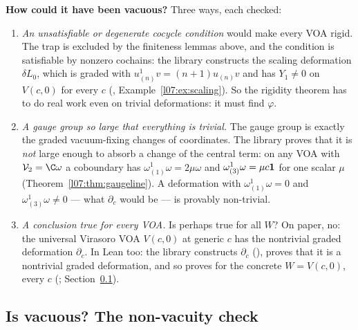 \begin{dictionary}
\textbf{How could it have been vacuous?} Three ways, each checked:
\begin{enumerate}
\item \emph{An unsatisfiable or degenerate cocycle condition} would make every VOA rigid. The
   trap is excluded by the finiteness lemmas above, and the condition is satisfiable
  by nonzero cochains: the library constructs the scaling deformation $\delta L_0$, which is graded
  with $u^1_{(n)}v = (n+1)u_{(n)}v$ and has $Y_1\neq0$ on $V(c,0)$ for every $c$
  (, Example~\ref{l07:ex:scaling}).
  So the rigidity theorem has to do real work even on trivial deformations: it must find $\varphi$.
\item \emph{A gauge group so large that everything is trivial.} The gauge group is exactly the
  graded vacuum-fixing changes of coordinates. The library proves that it is \emph{not} large
  enough to absorb a change of the central term: on any VOA with $\lsevenV_2 = \C\omega$ a coboundary
  has $\omega^1_{(1)}\omega = 2\mu\omega$ and $\omega^1_{(3)}\omega = \mu c\mathbf{1}$ for one scalar $\mu$
  (Theorem~\ref{l07:thm:gaugeline}). A deformation with $\omega^1_{(1)}\omega = 0$ and
  $\omega^1_{(3)}\omega\ne0$ --- what $\partial_c$ would be --- is provably non-trivial.
\item \emph{A conclusion true for every VOA.} Is  perhaps true for all $W$?
  On paper, no: the universal Virasoro VOA $V(c,0)$ at generic $c$ has the nontrivial graded
  deformation $\partial_c$. In Lean too: the library constructs $\partial_c$ (\allowbreak{}\allowbreak{}),
  proves that it is a nontrivial graded deformation, and so proves  for the concrete
  $W = V(c,0)$, every $c$ (\allowbreak{}\allowbreak{}\allowbreak{}\allowbreak{}; Section~\ref{l07:sec:nonvacuity}).
\end{enumerate}
\end{dictionary}

\subsection{Is \texorpdfstring{}{IsRigidGraded} vacuous? The non-vacuity check}\label{l07:sec:nonvacuity}

